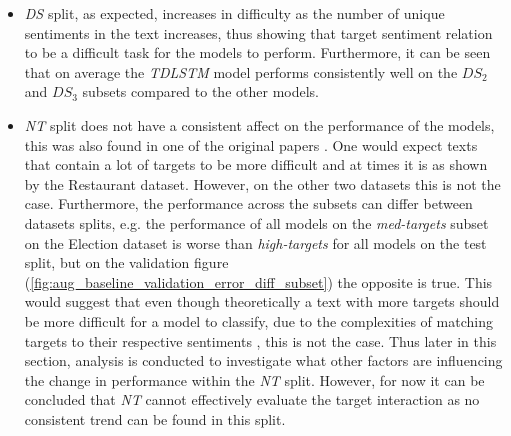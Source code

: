 \begin{itemize}
    \item \textit{DS} split, as expected, increases in difficulty as the number of unique sentiments in the text increases, thus showing that target sentiment relation to be a difficult task for the models to perform. Furthermore, it can be seen that on average the \textit{TDLSTM} model performs consistently well on the $DS_2$ and $DS_3$ subsets compared to the other models.
    \item \textit{NT} split does not have a consistent affect on the performance of the models, this was also found in one of the original papers \citep{zhang-etal-2019-aspect}. One would expect texts that contain a lot of targets to be more difficult and at times it is as shown by the Restaurant dataset. However, on the other two datasets this is not the case. Furthermore, the performance across the subsets can differ between datasets splits, e.g. the performance of all models on the \textit{med-targets} subset on the Election dataset is worse than \textit{high-targets} for all models on the test split, but on the validation figure (\ref{fig:aug_baseline_validation_error_diff_subset}) the opposite is true. This would suggest that even though theoretically a text with more targets should be more difficult for a model to classify, due to the complexities of matching targets to their respective sentiments \citep{zhang-etal-2019-aspect}, this is not the case. Thus later in this section, analysis is conducted to investigate what other factors are influencing the change in performance within the \textit{NT} split. However, for now it can be concluded that \textit{NT} cannot effectively evaluate the target interaction as no consistent trend can be found in this split.

\end{itemize}
